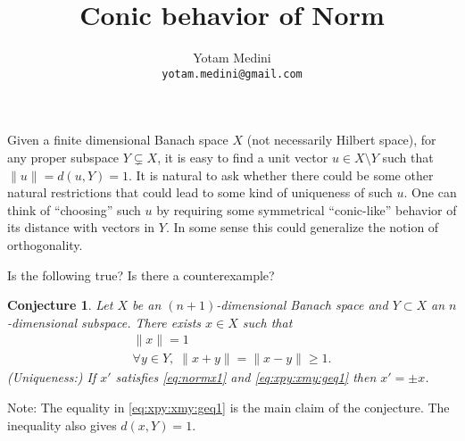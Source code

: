 \documentclass{article}
\title{Conic behavior of Norm}
\author{Yotam Medini \\ \texttt{yotam.medini@gmail.com}}
\newtheorem{conj}{Conjecture}[section]
\begin{document}
\maketitle

Given a finite dimensional Banach space $X$ (not necessarily Hilbert
space), for any proper subspace \(Y \subsetneq X\),
it is easy to find a unit vector
\(u \in X\setminus Y\) such that \(\|u\| = d(u,Y) = 1\).  It is
natural to ask whether there could be some other natural restrictions
that could lead to some kind of uniqueness of such $u$.  One can think
of ``choosing'' such $u$ by requiring some symmetrical ``conic-like''
behavior of its distance with vectors in $Y$.
In some sense this could generalize the notion of orthogonality.

Is the following true? Is there a counterexample?
\begin{conj}
Let $X$ be an \((n+1)\)-dimensional Banach space and
\(Y\subset X\) an $n$-dimensional subspace.
There exists \(x\in X\) such that
\begin{gather}
\|x\| = 1  \label{eq:normx1} \\
\forall y\in Y,\; \|x+y\| = \|x-y\| \geq 1. \label{eq:xpy:xmy:geq1}
\end{gather}
\textnormal{(Uniqueness:)}
If \(x'\) satisfies \eqref{eq:normx1} and \eqref{eq:xpy:xmy:geq1}
then \(x' = \pm x\).
\end{conj}

Note: The equality in \eqref{eq:xpy:xmy:geq1} is the main claim of the
conjecture.  The inequality also gives \(d(x,Y)=1\).
\end{document}
